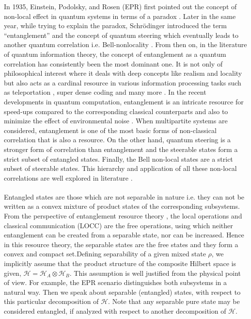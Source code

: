 In 1935, Einstein, Podolsky, and Rosen (EPR) first pointed out the concept of non-local effect in quantum systems in terms of a paradox \cite{EPR_35}. Later in the same year, while trying to explain the paradox, Schr\"{o}dinger \cite{S_35} introduced the term ``entanglement'' and the concept of quantum steering \cite{S_35, WJD_07, JWD_07} which eventually leads to another quantum correlation i.e. Bell-nonlocality \cite{B_64}. From then on, in the literature of quantum information theory, the concept of entanglement as a quantum correlation has consistently been the most dominant one. It is not only of philosophical interest where it deals with deep concepts like realism and locality but also acts as a cardinal resource in various information processing tasks such as teleportation \cite{BBCJPW_93}, super dense coding \cite{BW_92} and many more \cite{BB_84, E_91}. In the recent developments in quantum computation, entanglement is an intricate resource for speed-ups compared to the corresponding classical counterparts \cite{LP_01, JL_03,V_13,GH_23} and also to minimize the effect of environmental noise \cite{DGPM_17}. When multipartite systems are considered, entanglement is one of the most basic forms of non-classical correlation that is also a resource. On the other hand, quantum steering is a stronger form of correlation than entanglement and the steerable states form a strict subset of entangled states. Finally, the Bell non-local states are a strict subset of steerable states. This hierarchy \cite{WJD_07} and application of all these non-local correlations are well explored in literature \cite{TR_11,BCWSW_12}. \\\\
Entangled states are those which are not separable in nature i.e. they can not be written as a convex mixture of product states of the corresponding subsystems. From the perspective of entanglement resource theory \cite{HHH_09}, the local operations and classical communication (LOCC) are the free operations, using which neither entanglement can be created from a separable state, nor can be increased. Hence in this resource theory, the separable states are the free states and they form a convex and compact set.Defining separability of a given mixed state $\rho$, we implicitly assume that the product structure of the composite
Hilbert space is given, $\mathcal{H} = \mathcal{H}_A \otimes \mathcal{H}_B$. This assumption is well justified from the physical point of view. For example,
the EPR scenario distinguishes both subsystems in a natural way. Then we speak about separable (entangled) states, with respect to this particular decomposition of $\mathcal{H}$. Note that any separable pure state may be considered entangled, if analyzed with respect to another decomposition of $\mathcal{H}$.
